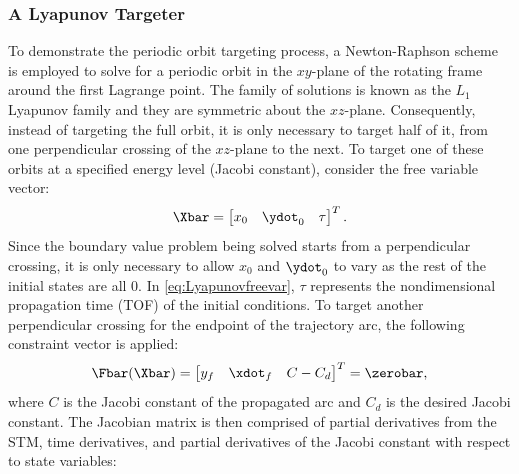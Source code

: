 \subsubsection{A Lyapunov Targeter}
To demonstrate the periodic orbit targeting process, a Newton-Raphson scheme is employed to solve
for a periodic orbit in the $xy$-plane of the rotating frame around the first Lagrange point. The
family of solutions is known as the $L_{1}$ Lyapunov family and they are symmetric about the
$xz$-plane. Consequently, instead of targeting the full orbit, it is only necessary to target half
of it, from one perpendicular crossing of the $xz$-plane to the next. To target one of these orbits
at a specified energy level (Jacobi constant), consider the free variable vector:
\begin{equation}
    \Xbar=\begin{bmatrix}   x_{0}   &   \ydot_{0}   &   \tau    \end{bmatrix}^{T}.
    \label{eq:Lyapunovfreevar}
\end{equation}
Since the boundary value problem being solved starts from a perpendicular crossing, it is only
necessary to allow $x_{0}$ and $\ydot_{0}$ to vary as the rest of the initial states are all $0$.
In \cref{eq:Lyapunovfreevar}, $\tau$ represents the nondimensional propagation time (TOF) of the
initial conditions. To target another perpendicular crossing for the endpoint of the trajectory
arc, the following constraint vector is applied:
\begin{equation}
    \Fbar(\Xbar)=\begin{bmatrix}    y_{f}   &   \xdot_{f}   &   C-C_{d} \end{bmatrix}^{T}=\zerobar,
    \label{eq:Lyapunovconst}
\end{equation}
where $C$ is the Jacobi constant of the propagated arc and $C_{d}$ is the desired Jacobi constant.
The Jacobian matrix is then comprised of partial derivatives from the STM, time derivatives, and
partial derivatives of the Jacobi constant with respect to state variables:
